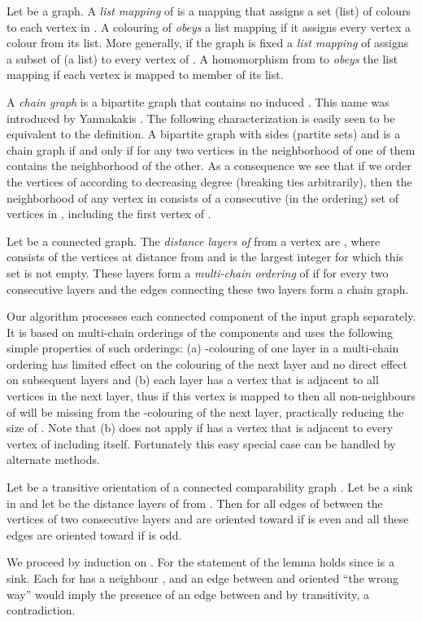 \documentclass[12pt]{llncs}
\begin{document}
Let  be a graph.  A \emph{list mapping} of  is a
mapping that assigns a set (list) of colours to each vertex in .
A colouring of  \emph{obeys} a list mapping if it assigns every
vertex a colour from its list. More generally, if the graph  is fixed a
{\em list mapping} of  assigns a subset of  (a list) to every vertex
of . A homomorphism from  to  {\em obeys} the list mapping if each
vertex is mapped to member of its list.

A {\em chain graph} is a bipartite graph that contains no induced .
This name was introduced by Yannakakis \cite{Yann}. The following
characterization is easily seen to be equivalent to the definition. A
bipartite graph with sides (partite sets)  and  is a chain graph if and
only if for any two vertices in  the neighborhood of one of them contains
the neighborhood of the other. As a consequence we see that if we order the
vertices of  according to decreasing degree (breaking ties arbitrarily),
then the neighborhood of any vertex in  consists of 
a consecutive (in the ordering) set of vertices in , including the first vertex of .

Let  be a connected graph. The {\em distance layers of
} from a vertex  are , where 
consists of the vertices at distance  from  and  is the
largest integer for which this set is not empty. These layers form
a \emph{multi-chain ordering} of  if for every two consecutive layers 
and  the edges connecting these two layers form a chain graph.

Our algorithm processes each connected component of the input graph
separately. It is based on multi-chain orderings of the components and uses the
following simple properties of such orderings: (a) -colouring of one
layer in a multi-chain ordering has limited effect on the colouring
of the next layer and no direct effect on subsequent layers and (b)
each layer has a vertex that is adjacent to all vertices in the next
layer, thus if this vertex is mapped to  then all non-neighbours of  will be
missing from the -colouring of the next layer, practically reducing the
size of . Note that (b) does not apply if  has a vertex  that is
adjacent to every vertex of  including itself. Fortunately this easy
special case can be handled by alternate methods.

\begin{lemma}\label{lem:TransReg}
Let  be a transitive
orientation of a connected comparability graph . Let  be a
sink 
in  and let  be the distance layers
of  from .
Then for  all edges of  between the
vertices of two consecutive layers  and  are oriented
toward  if  is even and all these edges are oriented toward
 if  is odd.
\end{lemma}
\begin{my_proof}
We proceed by induction on . For  the statement of the lemma
holds since  is a sink. Each  for  has a neighbour
, and an edge between  and  oriented
``the wrong way'' would imply the presence of an edge between  and
 by transitivity, a contradiction.
\end{my_proof}
\end{document}
